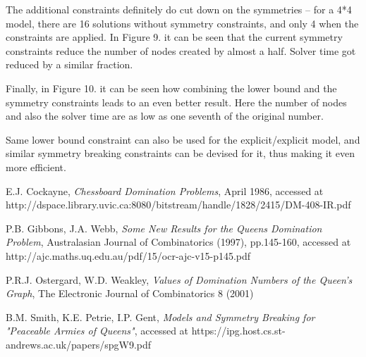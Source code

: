 \documentclass{report}
\begin{document}
The additional constraints definitely do cut down on the symmetries -- for a 4*4 model, there are 16 solutions without symmetry constraints, and only 4 when the constraints are applied. In Figure 9. it can be seen that the current symmetry constraints reduce the number of nodes created by almost a half. Solver time got reduced by a similar fraction.

Finally, in Figure 10. it can be seen how combining the lower bound and the symmetry constraints leads to an even better result. Here the number of nodes and also the solver time are as low as one seventh of the original number.

Same lower bound constraint can also be used for the explicit/explicit model, and similar symmetry breaking constraints can be devised for it, thus making it even more efficient.





\begin{thebibliography}{9}

 E.J. Cockayne,
  \emph{Chessboard Domination Problems},
  April 1986, accessed at http://dspace.library.uvic.ca:8080/bitstream/handle/1828/2415/DM-408-IR.pdf
  
   P.B. Gibbons, J.A. Webb,
  \emph{Some New Results for the Queens Domination Problem}, Australasian Journal of Combinatorics (1997), pp.145-160, accessed at http://ajc.maths.uq.edu.au/pdf/15/ocr-ajc-v15-p145.pdf
  
   P.R.J. Ostergard, W.D. Weakley,
  \emph{Values of Domination Numbers of the Queen’s Graph}, The Electronic Journal of Combinatorics 8 (2001)
 
   B.M. Smith, K.E. Petrie, I.P. Gent,
  \emph{Models and Symmetry Breaking for "Peaceable Armies of Queens"}, accessed at https://ipg.host.cs.st-andrews.ac.uk/papers/spgW9.pdf


\end{thebibliography}
\end{document}
